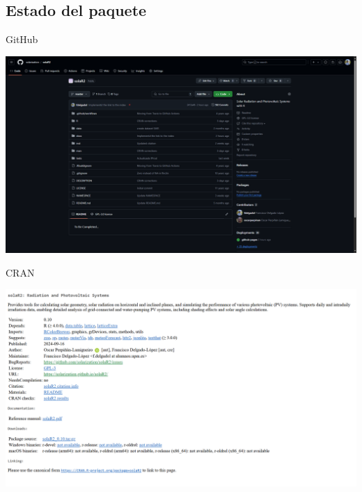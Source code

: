\documentclass[aspectratio=169, usenames,svgnames,dvipsnames]{beamer}
\begin{document}
\subsection{Estado del paquete}
\label{sec:org6c9a17e}
\begin{frame}[label={sec:orgd78677e}]{GitHub}
\begin{center}
\href{https://github.com/solarization/solaR2}{\includegraphics[width=.9\linewidth]{../figuras/GitHub.png}}
\end{center}
\end{frame}
\begin{frame}[label={sec:org28b4e35}]{CRAN}
\begin{center}
\href{https://cran.r-project.org/package=solaR2}{\includegraphics[width=.9\linewidth]{../figuras/CRAN.png}}
\end{center}
\end{frame}
\end{document}
